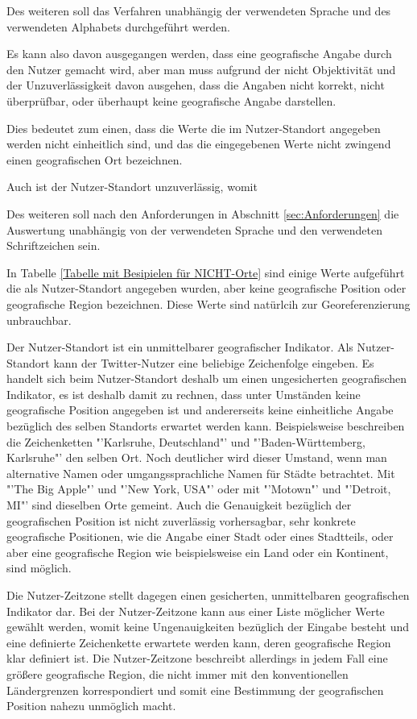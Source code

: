 		Des weiteren soll das Verfahren unabhängig der verwendeten Sprache und des verwendeten Alphabets durchgeführt werden.

		Es kann also davon ausgegangen werden, dass eine geografische Angabe durch den Nutzer gemacht wird, aber man muss aufgrund der nicht Objektivität und der Unzuverlässigkeit davon ausgehen, dass die Angaben nicht korrekt, nicht überprüfbar, oder überhaupt keine geografische Angabe darstellen. 

		Dies bedeutet zum einen, dass die Werte die im Nutzer-Standort angegeben werden nicht einheitlich sind, und das die eingegebenen Werte nicht zwingend einen geografischen Ort bezeichnen. 

		Auch ist der Nutzer-Standort unzuverlässig, womit
		



		Des weiteren soll nach den Anforderungen in Abschnitt \ref{sec:Anforderungen} die Auswertung unabhängig von der verwendeten Sprache und den verwendeten Schriftzeichen sein. 


		

		In Tabelle \ref{Tabelle mit Besipielen für NICHT-Orte} sind einige Werte aufgeführt die als Nutzer-Standort angegeben wurden, aber keine geografische Position oder geografische Region bezeichnen. 
		Diese Werte sind natürlcih zur Georeferenzierung unbrauchbar. 


		Der Nutzer-Standort ist ein unmittelbarer geografischer Indikator.  
		Als Nutzer-Standort kann der Twitter-Nutzer eine beliebige Zeichenfolge eingeben. 
		Es handelt sich beim Nutzer-Standort deshalb um einen ungesicherten geografischen Indikator, es ist deshalb damit zu rechnen, dass unter Umständen keine geografische Position angegeben ist und andererseits keine einheitliche Angabe bezüglich des selben Standorts erwartet werden kann.
		Beispielsweise beschreiben die Zeichenketten "'Karlsruhe, Deutschland"' und "'Baden-Württemberg, Karlsruhe"' den selben Ort.
		Noch deutlicher wird dieser Umstand, wenn man alternative Namen oder umgangssprachliche Namen für Städte betrachtet. 
		Mit "'The Big Apple"' und "'New York, USA"' oder mit "'Motown"' und "'Detroit, MI"' sind dieselben Orte gemeint.   
		Auch die Genauigkeit bezüglich der geografischen Position ist nicht zuverlässig vorhersagbar, sehr konkrete geografische Positionen, wie die Angabe einer Stadt oder eines Stadtteils, oder aber eine geografische Region wie beispielsweise ein Land oder ein Kontinent, sind möglich. 

		Die Nutzer-Zeitzone stellt dagegen einen gesicherten, unmittelbaren geografischen Indikator dar.
		Bei der Nutzer-Zeitzone kann aus einer Liste möglicher Werte gewählt werden, womit keine Ungenauigkeiten bezüglich der Eingabe besteht und eine definierte Zeichenkette erwartete werden kann, deren geografische Region klar definiert ist. 
		Die Nutzer-Zeitzone beschreibt allerdings in jedem Fall eine größere geografische Region, die nicht immer mit den konventionellen Ländergrenzen korrespondiert und somit eine Bestimmung der geografischen Position nahezu unmöglich macht.

